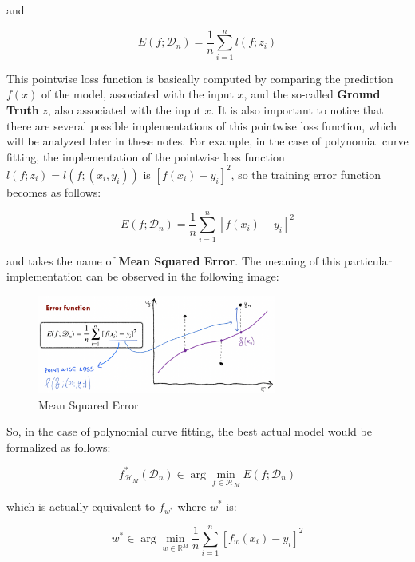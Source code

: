 and

\begin{equation*}
      E(f; \mathcal{D}_n) = \frac{1}{n} \sum_{i = 1}^{n} l(f;z_i)
\end{equation*}

This pointwise loss function is basically computed by comparing the prediction $f(x)$
of the model, associated with the input $x$, and the so-called \textbf{Ground Truth}
$z$, also associated with the input $x$. It is also important to notice that there are
several possible implementations of this pointwise loss function, which will be
analyzed later in these notes. For example, in the case of polynomial curve fitting,
the implementation of the pointwise loss function $l(f;z_i) = l(f;(x_i,y_i))$ is
$[f(x_i) - y_i]^2$, so the training error function becomes as follows:

\begin{equation*}
      E(f; \mathcal{D}_n) = \frac{1}{n} \sum_{i = 1}^{n} [f(x_i) - y_i]^2
\end{equation*}

and takes the name of \textbf{Mean Squared Error}. The meaning of this particular
implementation can be observed in the following image:

\newpage

\begin{figure}[h]
      \centering
      \includegraphics[width=0.7\textwidth]{../img/Mean_squared_error}
      \caption{Mean Squared Error}
\end{figure}

So, in the case of polynomial curve fitting, the best actual model would be
formalized as follows:

\begin{equation*}
      f_{\mathcal{H}_M}^*(\mathcal{D}_n) \in \arg \min_{f \in \mathcal{H}_M} E(f; \mathcal{D}_n)
\end{equation*}

which is actually equivalent to $f_{w^*}$ where $w^*$ is:

\begin{equation*}
      w^* \in \arg \min_{w \in \mathbb{R}^M} \frac{1}{n} \sum_{i = 1}^{n} [f_w(x_i) - y_i]^2
\end{equation*}

